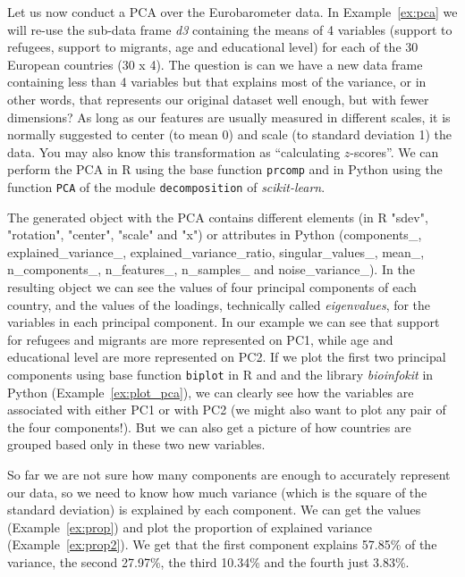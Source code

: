 Let us now conduct a PCA over the Eurobarometer data.  In Example~\ref{ex:pca} we will re-use the sub-data frame \emph{d3} containing the means of 4 variables (support to refugees, support to migrants, age and educational level) for each of the 30 European countries (30 x 4). The question is  can we have a new data frame containing less than 4 variables but that explains most of the variance, or in other words, that represents our original dataset well enough, but with fewer dimensions? As long as our features are usually measured in different scales, it is normally suggested to center (to mean 0) and scale (to standard deviation 1) the data. You may also know this transformation as ``calculating $z$-scores''. We can perform the PCA in R using the base function \texttt{prcomp} and in Python using the function \texttt{PCA} of the module \texttt{decomposition} of \emph{scikit-learn}.


The generated object with the PCA contains different elements (in R "sdev",     "rotation", "center",  "scale" and   "x") or attributes in Python (components\_, explained\_variance\_, explained\_variance\_ratio, singular\_values\_, mean\_, n\_components\_, n\_features\_, n\_samples\_ and noise\_variance\_). In the resulting object we can see the values of four principal components of each country, and the values of the loadings, technically called \textit{eigenvalues}, for the variables in each principal component.  In our example we can see that support for refugees and migrants are more represented on PC1, while age and educational level are more represented on PC2. If we plot the first two principal components using base function \texttt{biplot} in R and and the library \emph{bioinfokit} in Python (Example~\ref{ex:plot_pca}), we can clearly see how the variables are associated with either PC1 or with PC2 (we might also want to plot any pair of the four components!). But we can also get a picture of how countries are grouped based only in these two new variables.


So far we are not sure  how many components are enough to accurately represent our data, so we need to know how much variance (which is the square of the standard deviation) is explained by each component. We can get the values (Example~\ref{ex:prop}) and plot  the proportion of explained variance (Example~\ref{ex:prop2}). We get that the first component explains 57.85\% of the variance, the second 27.97\%, the third 10.34\% and the fourth just 3.83\%.

